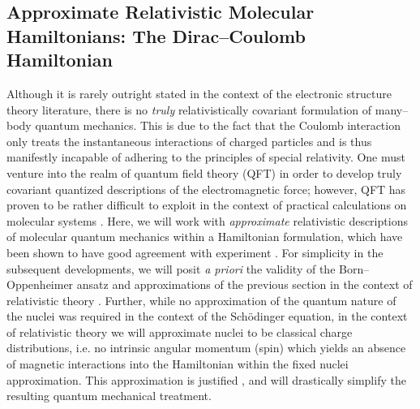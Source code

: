 \subsection{Approximate Relativistic  Molecular Hamiltonians: The Dirac--Coulomb Hamiltonian}





Although it is rarely outright stated in the context of the electronic structure theory
literature, there is no \emph{truly} relativistically covariant formulation of many--body quantum 
mechanics. This is due to the fact that the Coulomb interaction only treats the instantaneous interactions
of charged particles and is thus manifestly incapable of adhering to the principles of special relativity.
One must venture into the realm of quantum field theory (QFT) in order to develop truly covariant quantized 
descriptions of the electromagnetic force; however, QFT has proven to be rather difficult to exploit in
the context of practical calculations on molecular systems . Here, we will work with
\emph{approximate} relativistic descriptions of molecular quantum mechanics within a Hamiltonian
formulation, which have been shown to have good agreement with experiment .
For simplicity in the subsequent developments, we will posit \emph{a priori} the validity of the 
Born--Oppenheimer ansatz and approximations of the previous section in the context of relativistic
theory . Further, while no approximation of the quantum nature of the nuclei was required in the 
context of the Sch\"{o}dinger equation, in the context of relativistic theory we will approximate
nuclei to be classical charge distributions, i.e. no intrinsic angular momentum (spin) which
yields an absence of magnetic interactions into the Hamiltonian within the fixed nuclei approximation.
This approximation is justified , and will drastically simplify the resulting 
quantum mechanical treatment.

